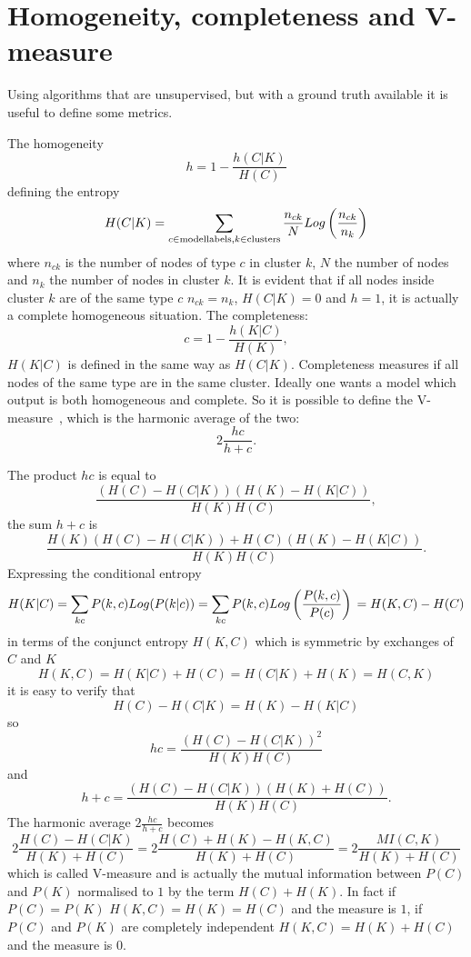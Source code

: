 \chapter{Homogeneity, completeness and V-measure}\label{app:vmeasure}
Using algorithms that are unsupervised, but with a ground truth available it is useful to define some metrics.

The homogeneity
\begin{equation}
    h=1-\frac{h(C|K)}{H(C)}
\end{equation}
defining the entropy
\begin{equation}
    H(C|K)=\sum_{c\in \mathrm{model labels},\\ k \in \mathrm{clusters}}\frac{n_{c k}}{N}Log\left(\frac{n_{c k}}{n_k}\right)
\end{equation}
where $n_{c k}$ is the number of nodes of type $c$ in cluster $k$, $N$ the number of nodes and $n_k$ the number of nodes in cluster $k$. It is evident that if all nodes inside cluster $k$ are of the same type $c$ $n_{c k}=n_{k}$, $H(C|K)=0$ and $h=1$, it is actually a complete homogeneous situation.
The completeness:
\begin{equation}
    c=1-\frac{h(K|C)}{H(K)},
\end{equation}
$H(K|C)$ is defined in the same way as $H(C|K)$. Completeness measures if all nodes of the same type are in the same cluster.
Ideally one wants a model which output is both homogeneous and complete. So it is possible to define the V-measure~\cite{rosenberg2007v}, which is the harmonic average of the two:
\begin{equation}
    2\frac{h c}{h + c}.
\end{equation}

The product $h c$ is equal to
\begin{equation}
    \frac{(H(C)-H(C|K))(H(K)-H(K|C))}{H(K) H(C)},
\end{equation}
the sum $h + c$ is
\begin{equation}
    \frac{H(K)(H(C)-H(C|K))+H(C)(H(K)-H(K|C))}{H(K) H(C)}.
\end{equation}
Expressing the conditional entropy 
\[
H(K|C)=\sum_{k c} P(k,c)Log(P(k|c))
\\=\sum_{k c} P(k,c)Log\left(\frac{P(k,c)}{P(c)}\right)
\\=H(K,C) - H(C)
\]
in terms of the conjunct entropy $H(K,C)$ which is symmetric by exchanges of $C$ and $K$
\[
H(K,C)=H(K|C) + H(C) = H(C|K) + H(K) = H(C,K)
\]
it is easy to verify that 
\[
H(C) - H(C|K) = H(K) - H(K|C) 
\]
so
\[
h c = \frac{(H(C)-H(C|K))^2}{H(K) H(C)}
\]
and
\[
h + c = \frac{(H(C)-H(C|K))(H(K)+H(C))}{H(K) H(C)}.
\]
The harmonic average $2\frac{h c}{h + c}$ becomes
\[
2\frac{H(C)-H(C|K)}{H(K)+H(C)}=2\frac{H(C)+H(K)-H(K,C)}{H(K)+H(C)}=2\frac{MI(C,K)}{H(K)+H(C)}
\]
which is called V-measure and is actually the mutual information between $P(C)$ and $P(K)$ normalised to $1$ by the term $H(C)+H(K)$. In fact if $P(C)=P(K)$ $H(K,C)=H(K)=H(C)$ and the measure is $1$, if $P(C)$ and $P(K)$ are completely independent $H(K,C)=H(K)+H(C)$ and the measure is $0$.
